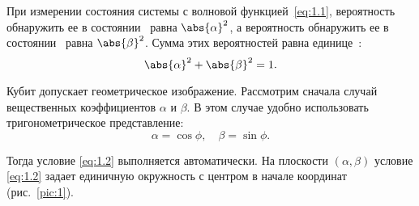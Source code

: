 \documentclass[pscyr,notitlepage]{hedwork}
\newcommand{\eq}[1]{\eqref{eq:#1}}
\newcommand{\pic}[1]{\ref{pic:#1}}
\renewcommand{\~}[1]{\widetilde{#1}}
\begin{document}
  При измерении состояния системы с волновой функцией~\eq{1.1}, вероятность
  обнаружить ее в состоянии~ равна \( \abs{\alpha}^2 \), а вероятность
  обнаружить ее в состоянии~ равна \( \abs{\beta}^2 \). Сумма этих
  вероятностей равна единице~\cite{main,task,brbr,2}:
  \begin{equation}
    \abs{\alpha}^2 + \abs{\beta}^2 = 1.
    \label{eq:1.2}
  \end{equation}
  
  Кубит допускает геометрическое изображение. Рассмотрим сначала случай
  вещественных коэффициентов \( \alpha \) и \( \beta \). В этом случае
  удобно использовать тригонометрическое представление:
  \begin{equation}
    \alpha = \cos\phi, \quad
      \beta = \sin\phi.
    \label{eq:1.4}
  \end{equation}
  
  Тогда условие \eq{1.2} выполняется автоматически. На плоскости
  \( (\alpha, \beta) \) условие \eq{1.2} задает единичную окружность с центром
  в начале координат (рис.~\pic{1}).
  
\end{document}
